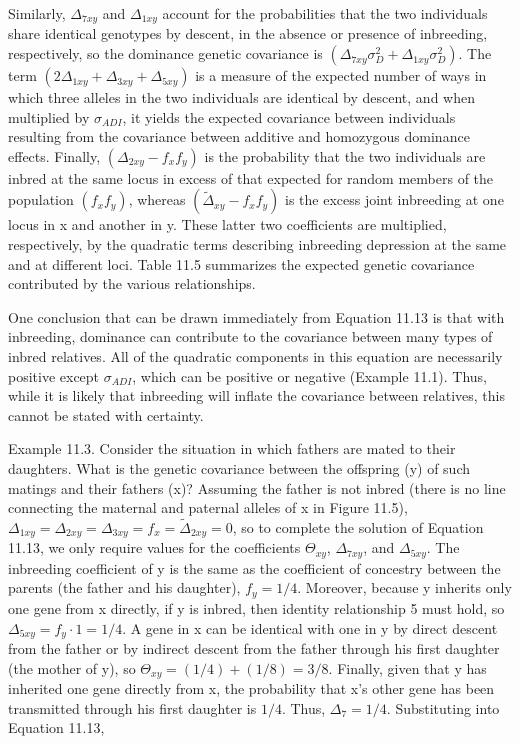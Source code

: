 \documentclass{article}
\begin{document}
Similarly,  $ \Delta_{7xy} $ and  $ \Delta_{1xy} $ account for the probabilities that the two individuals share identical genotypes by descent, in the absence or presence of inbreeding, respectively, so the dominance genetic covariance is  $ (\Delta_{7xy}\sigma_{D}^{2}+\Delta_{1xy}\sigma_{D}^{2}) $. The term  $ (2\Delta_{1xy}+\Delta_{3xy}+\Delta_{5xy}) $ is a measure of the expected number of ways in which three alleles in the two individuals are identical by descent, and when multiplied by  $ \sigma_{ADI} $, it yields the expected covariance between individuals resulting from the covariance between additive and homozygous dominance effects. Finally,  $ (\Delta_{2xy}-f_{x}f_{y}) $ is the probability that the two individuals are inbred at the same locus in excess of that expected for random members of the population  $ (f_{x}f_{y}) $, whereas  $ (\widetilde{\Delta}_{xy}-f_{x}f_{y}) $ is the excess joint inbreeding at one locus in x and another in y. These latter two coefficients are multiplied, respectively, by the quadratic terms describing inbreeding depression at the same and at different loci. Table 11.5 summarizes the expected genetic covariance contributed by the various relationships.

One conclusion that can be drawn immediately from Equation 11.13 is that with inbreeding, dominance can contribute to the covariance between many types of inbred relatives. All of the quadratic components in this equation are necessarily positive except  $ \sigma_{ADI} $, which can be positive or negative (Example 11.1). Thus, while it is likely that inbreeding will inflate the covariance between relatives, this cannot be stated with certainty.

Example 11.3. Consider the situation in which fathers are mated to their daughters. What is the genetic covariance between the offspring (y) of such matings and their fathers (x)? Assuming the father is not inbred (there is no line connecting the maternal and paternal alleles of x in Figure 11.5),  $ \Delta_{1xy} = \Delta_{2xy} = \Delta_{3xy} = f_x = \widetilde{\Delta}_{2xy} = 0 $, so to complete the solution of Equation 11.13, we only require values for the coefficients  $ \Theta_{xy} $,  $ \Delta_{7xy} $, and  $ \Delta_{5xy} $. The inbreeding coefficient of y is the same as the coefficient of concestry between the parents (the father and his daughter),  $ f_y = 1/4 $. Moreover, because y inherits only one gene from x directly, if y is inbred, then identity relationship 5 must hold, so  $ \Delta_{5xy} = f_y \cdot 1 = 1/4 $. A gene in x can be identical with one in y by direct descent from the father or by indirect descent from the father through his first daughter (the mother of y), so  $ \Theta_{xy} = (1/4) + (1/8) = 3/8 $. Finally, given that y has inherited one gene directly from x, the probability that x's other gene has been transmitted through his first daughter is  $ 1/4 $. Thus,  $ \Delta_7 = 1/4 $. Substituting into Equation 11.13,
\end{document}
